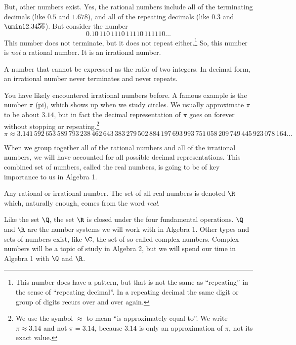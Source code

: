 But, other numbers exist. Yes, the rational numbers include all of the terminating decimals (like $0.5$ and $1.678$), and all of the repeating decimals (like $0.\overline{3}$ and $\umin12.34\overline{56}$). But consider the number \[0.10\,110\,1110\,11110\,111110\ldots\] This number does not terminate, but it does not repeat either.\footnote{This number does have a pattern, but that is not the same as ``repeating'' in the sense of ``repeating decimal''. In a repeating decimal the same digit or group of digits recurs over and over again.} So, this number is \textit{not} a rational number. It is an \gls{irrational number}.

\begin{boxdef}
A number that cannot be expressed as the ratio of two integers. In decimal form, an irrational number never terminates and never repeats.
\end{boxdef}

You have likely encountered irrational numbers before. A famous example is the number $\pi$ (pi), which shows up when we study circles. We usually approximate $\pi$ to be about $3.14$, but in fact the decimal representation of $\pi$ goes on forever without stopping or repeating.\footnote{We use the symbol $\approx$ to mean ``is approximately equal to''. We write $\pi\approx3.14$ and not $\pi=3.14$, because 3.14 is only an approximation of $\pi$, not its exact value.}
\[\pi \approx 3. 141\,592\,653\,589\,793\,238\,462\,643\,383\,279\,502\,884\,197\,693\,993\,751\,058\,209\,749\,445\,923\,078\,164\ldots\]

When we group together all of the rational numbers and all of the irrational numbers, we will have accounted for all possible decimal representations. This combined set of numbers, called the \glspl{real number}, is going to be of key importance to us in Algebra 1.

\begin{boxdef}
Any rational or irrational number. The set of all real numbers is denoted $\R$ which, naturally enough, comes from the word \textit{real}.
\end{boxdef}

Like the set $\Q$, the set $\R$ is closed under the four fundamental operations. $\Q$ and $\R$ are the number systems we will work with in Algebra 1. Other types and sets of numbers exist, like $\C$, the set of so-called \glspl{complex number}. Complex numbers will be a topic of study in Algebra 2, but we will spend our time in Algebra 1 with $\Q$ and $\R$.


